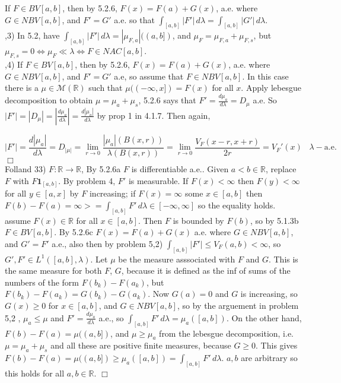 \documentclass[12pt]{article}
\newcommand{\lrimply}[0] { \Leftrightarrow }
\newcommand{\rarw}[0] { \rightarrow }
\newcommand{ \cf }[1] { \mathbf{1}_{#1} }
\newcommand{\reals}[0] { \mathbb{R}}
\newcommand{\M}[0] { \mathcal{M} }
\begin{document}
\noindent
If $F \in BV[a,b]$, then by 5.2.6, $F(x) = F(a) + G(x)$, a.e. where $G \in NBV[a,b]$, and $F'=G'$ a.e. so that $\int_{[a,b]} |F'| \, d\lambda = \int_{[a,b]} |G'| \, d\lambda$. \\


,3) In 5.2, have $\int_{[a,b]} |F'| \, d\lambda = |\mu_{F,a}|((a,b])$, and $\mu_{F} = \mu_{F,a} + \mu_{F,s}$, but $\mu_{F,s} = 0 \lrimply \mu_{F} \ll \lambda \lrimply F \in NAC[a,b]$. \\

,4) If $F \in BV[a,b]$, then by 5.2.6, $F(x) = F(a) + G(x)$, a.e. where $G \in NBV[a,b]$, and $F'=G'$ a.e, so assume that $F \in NBV[a,b]$. In this case there is a $\mu \in \M(\reals)$ such that $\mu((-\infty,x]) = F(x)$ for all $x$. Apply lebesgue decomposition to obtain $\mu = \mu_a + \mu_s$, 5.2.6 says that $F' = \frac{d\mu_a}{d\lambda} = D_\mu$ a.e. So $|F'| = |D_\mu|= |\frac{d\mu_a}{d\lambda}| = \frac{d|\mu_a|}{d\lambda}$ by prop 1 in 4.1.7. Then again,


$$
|F'| = \frac{d|\mu_a|}{d\lambda} = D_{|\mu|} = \lim_{r \rarw 0} \frac{ |\mu_a|(B(x,r))}{ \lambda(B(x,r))} = \lim_{r \rarw 0} \frac{ V_F(x-r,x+r) }{2r}  = V_F'(x) \; \; \;  \lambda-\textrm{a.e.}
$$ $\Box$ \\


\noindent
Folland 33) $F: \reals \rarw \reals$, By 5.2.6a $F$ is differentiable a.e.. Given $a<b \in \reals$, replace $F$ with $F \cf{[a,b]}$. By problem 4, $F'$ is measurable. If $F(x) < \infty$ then $F(y) < \infty$ for all $y \in [a,x]$ by $F$ increasing; if $F(x) = \infty$ some $x \in [a,b]$ then $F(b) - F(a) = \infty >= \int_{[a,b]} F' \, d\lambda \in [-\infty,\infty]$ so the equality holds. assume $F(x) \in \reals$ for all $x \in [a,b]$. Then $F$ is bounded by $F(b)$, so by 5.1.3b $F \in BV[a,b]$. By 5.2.6c $F(x) = F(a) + G(x)$ a.e. where $G \in NBV[a,b]$, and $G' = F'$ a.e., also then by problem 5,2) $\int_{[a,b]} |F'| \le V_F(a,b) < \infty$, so $G',F' \in L^1([a,b],\lambda)$. Let $\mu$ be the measure asssociated with $F$ and $G$. This is the same measure for both $F$, $G$, because it is defined as the inf of sums of the numbers of the form $F(b_k)-F(a_k)$, but $F(b_k)-F(a_k) = G(b_k) - G(a_k)$. Now $G(a) = 0$ and $G$ is increasing, so $G(x) \ge 0$ for $x \in [a,b]$, and $G \in NBV[a,b]$, so by the arguement in problem 5,2 , $\mu_{a} \le \mu$ and $F' = \frac{d \mu_a}{d\lambda}$ a.e., so $\int_{[a,b]} F' \, d\lambda = \mu_a([a,b])$. On the other hand, $F(b) - F(a) = \mu((a,b])$, and $ \mu \ge \mu_a$ from the lebesgue decomposition, i.e. $\mu = \mu_a + \mu_s$ and all these are positive finite measures, because $G \ge 0$. This gives $F(b) - F(a) = \mu((a,b]) \ge \mu_a([a,b])  = \int_{[a,b]} F' \, d\lambda$. $a,b$ are arbitrary so this holds for all $a,b \in \reals$. $\Box$
\end{document}
